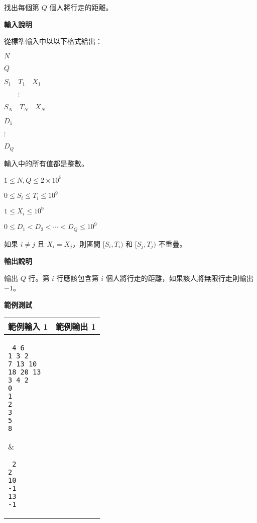     找出每個第 $Q$ 個人將行走的距離。

    \textbf{輸入說明}

    從標準輸入中以以下格式給出：

    $N$

    $Q$

    $S_1 \quad T_1 \quad X_1$

    $\quad \quad \vdots$

    $S_N \quad T_N \quad X_N$

    $D_1$

    $\vdots$

    $D_Q$

    輸入中的所有值都是整數。

    $1 \le N,Q \le 2 \times 10^5$

    $0 \le S_i \le T_i \le 10^9$

    $1 \le X_i \le 10^9$

    $0 \le D_1 < D_2 < \cdots < D_Q \le 10^9$

    如果 $i \neq j$ 且 $X_i = X_j$，則區間 $[S_i,T_i)$ 和 $[S_j,T_j)$ 不重疊。

    \textbf{輸出說明}

    輸出 $Q$ 行。第 $i$ 行應該包含第 $i$ 個人將行走的距離，如果該人將無限行走則輸出 $-1$。

    \textbf{範例測試}

    \begin{tabular}{|m{7cm}|m{7cm}|}
        \hline
        範例輸入 1 & 範例輸出 1 \\
        \hline
        \parbox[t]{7cm} %
        { \tt
        4 6 \\
        1 3 2 \\
        7 13 10 \\
        18 20 13 \\
        3 4 2 \\
        0 \\
        1 \\
        2 \\
        3 \\
        5 \\
        8 \\
        } &
        \parbox[t]{7cm}
        { \tt
        2 \\
        2 \\ 
        10 \\
        -1 \\
        13 \\
        -1 \\
        } \\
        \hline
    \end{tabular}

